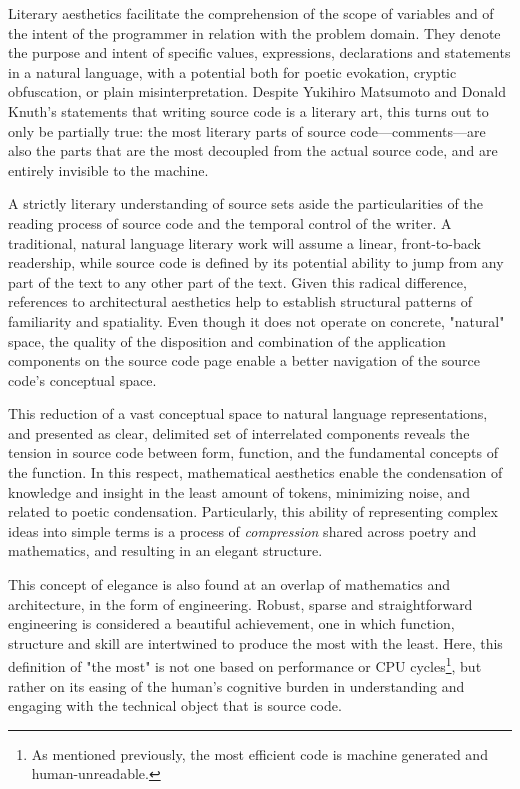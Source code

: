 Literary aesthetics facilitate the comprehension of the scope of variables and of the intent of the programmer in relation with the problem domain. They denote the purpose and intent of specific values, expressions, declarations and statements in a natural language, with a potential both for poetic evokation, cryptic obfuscation, or plain misinterpretation. Despite Yukihiro Matsumoto and Donald Knuth's statements that writing source code is a literary art, this turns out to only be partially true: the most literary parts of source code—comments—are also the parts that are the most decoupled from the actual source code, and are entirely invisible to the machine.

A strictly literary understanding of source sets aside the particularities of the reading process of source code and the temporal control of the writer. A traditional, natural language literary work will assume a linear, front-to-back readership, while source code is defined by its potential ability to jump from any part of the text to any other part of the text. Given this radical difference, references to architectural aesthetics help to establish structural patterns of familiarity and spatiality. Even though it does not operate on concrete, "natural" space, the quality of the disposition and combination of the application components on the source code page enable a better navigation of the source code's conceptual space.

This reduction of a vast conceptual space to natural language representations, and presented as clear, delimited set of interrelated components  reveals the tension in source code between form, function, and the fundamental concepts of the function. In this respect, mathematical aesthetics enable the condensation of knowledge and insight in the least amount of tokens, minimizing noise, and related to poetic condensation. Particularly, this ability of representing complex ideas into simple terms is a process of \emph{compression} shared across poetry and mathematics, and resulting in an elegant structure.

This concept of elegance is also found at an overlap of mathematics and architecture, in the form of engineering. Robust, sparse and straightforward engineering is considered a beautiful achievement, one in which function, structure and skill are intertwined to produce the most with the least. Here, this definition of "the most" is not one based on performance or CPU cycles\footnote{As mentioned previously, the most efficient code is machine generated and human-unreadable.}, but rather on its easing of the human's cognitive burden in understanding and engaging with the technical object that is source code.

